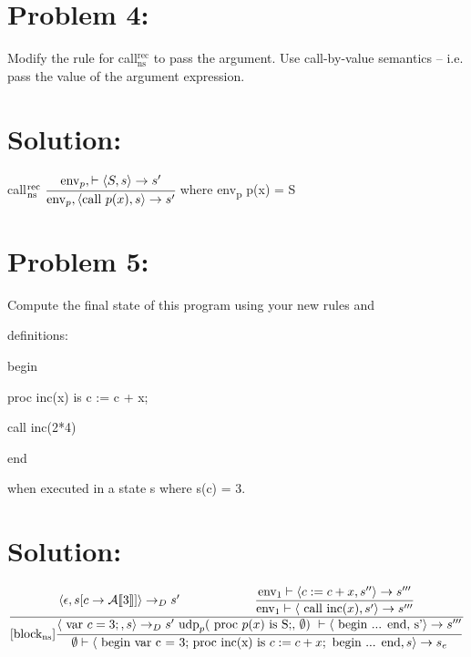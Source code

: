\documentclass[10pt]{article}
\begin{document}
\section*{Problem 4:}

Modify the rule for call$^{\text{rec}}_{\text{ns}}$ to pass the argument. Use call-by-value semantics – i.e. pass the value of the argument expression.

\section*{Solution:}

call$^{\text{rec}}_{\text{ns}} \ \cfrac{\text{env}_p, \vdash \langle S, s \rangle \rightarrow s'}{\text{env}_p, \langle \text{call } p(x), s \rangle \rightarrow s'}$ where env\textsubscript{p} p(x) = S

\section*{Problem 5:}

Compute the final state of this program using your new rules and 

definitions:

begin

\hspace{0.5cm} proc inc(x) is c := c + x;

\hspace{0.5cm} call inc(2*4)

end

when executed in a state s where s(c) = 3.

\section*{Solution:}


$\dfrac{\langle \epsilon, s[c \rightarrow \mathcal{A} \text{\textlbrackdbl}  3 \text{\textrbrackdbl}] \rangle \rightarrow_D s' \
\hspace{2cm } \dfrac{\text{env}_1 \vdash \langle c:= c + x, s'' \rangle \rightarrow s'''}
{\text{env}_1 \vdash \langle \text{ call  inc}(x), s' \rangle \rightarrow s'''}}
{[\text{block\textsubscript{ns}}]
\dfrac{\langle \text{ var } c = 3;, s \rangle \rightarrow_D s' \ \text{udp}_p(\text{ proc } p(x) \text{ is S;, } \emptyset) \ \vdash \langle \text{ begin ... end, s'} \rangle \rightarrow s'''}
{\emptyset \vdash \langle \text{ begin var c = 3; proc inc(x) is } c:= c+x; \text{ begin ... end}, s \rangle \rightarrow s_e}}$
\end{document}
